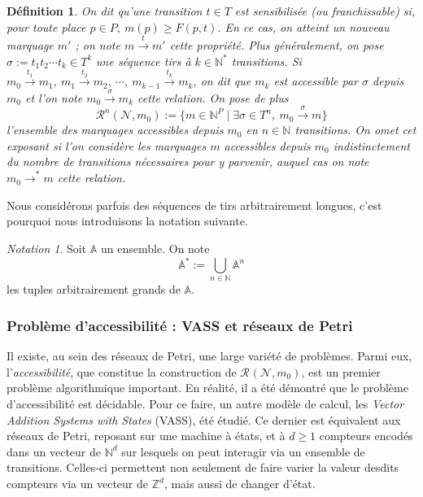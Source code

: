 \documentclass{article}
\newtheorem{definition}{Définition}
\theoremstyle{remark}
\theoremstyle{remark}
\newtheorem*{notation}{Notation}
\newcommand{\reach}[3][]{\mathcal{R}^{#1}(\mathcal{#2}, #3)}
\newcommand{\reaches}[1][]{\xrightarrow{#1}}
\newcommand{\reachess}{\reaches^*}
\begin{document}
\begin{definition}
    On dit qu'une transition $t \in T$ est sensibilisée (ou franchissable) si, pour toute place $p \in P,\ m(p) \geq F(p, t)$. En ce cas, on atteint un nouveau marquage $m'$ ; on note $m \reaches[t] m'$ cette propriété. Plus généralement, on pose $\sigma := t_1t_2 \cdots t_k \in T^k$ une séquence tirs à $k \in \mathbb{N}^*$ transitions. Si $m_0 \reaches[t_1] m_1,\ m_1 \reaches[t_2] m_2,\ \cdots,\ m_{k-1} \reaches[t_k] m_k$, on dit que $m_k$ est accessible par $\sigma$ depuis $m_0$ et l'on note $m_0 \reaches[\sigma] m_k$ cette relation. On pose de plus \[\reach[n]{N}{m_0} := \{m \in \mathbb{N}^P \mid \exists \sigma \in T^n,\ m_0 \reaches[\sigma] m\}\] l'ensemble des marquages accessibles depuis $m_0$ en $n \in \mathbb{N}$ transitions. On omet cet exposant si l'on considère les marquages $m$ accessibles depuis $m_0$ indistinctement du nombre de transitions nécessaires pour y parvenir, auquel cas on note $m_0 \reachess m$ cette relation.
\end{definition}

Nous considérons parfois des séquences de tirs arbitrairement longues, c'est pourquoi nous introduisons la notation suivante.

\begin{notation}
    Soit $\mathbb{A}$ un ensemble. On note \[\mathbb{A}^* := \bigcup_{n \in \mathbb{N}} \mathbb{A}^n\] les tuples arbitrairement grands de $\mathbb{A}$.
\end{notation}

\subsubsection{Problème d'accessibilité : VASS et réseaux de Petri}

Il existe, au sein des réseaux de Petri, une large variété de problèmes. Parmi eux, l'\textit{accessibilité}, que constitue la construction de $\reach{N}{m_0}$, est un premier problème algorithmique important. En réalité, il a été démontré que le problème d'accessibilité est décidable. Pour ce faire, un autre modèle de calcul, les \textit{Vector Addition Systems with States} (VASS), été étudié. Ce dernier est équivalent aux réseaux de Petri, reposant sur une machine à états, et à $d \geq 1$ compteurs encodés dans un vecteur de $\mathbb{N}^d$ sur lesquels on peut interagir via un ensemble de transitions. Celles-ci permettent non seulement de faire varier la valeur desdits compteurs via un vecteur de $\mathbb{Z}^d$, mais aussi de changer d'état.
\end{document}
